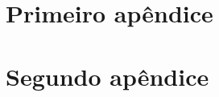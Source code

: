 \documentclass[12pt,twoside,openright,a4paper]{abntex2}
\begin{document}

%
%

\appendix

\chapter{Primeiro apêndice}

\lipsum[50-52]

\chapter{Segundo apêndice}
\lipsum[55-57]


% 
% 
% 



\cleardoublepage
{} 
{}
\printindex
\end{document}
